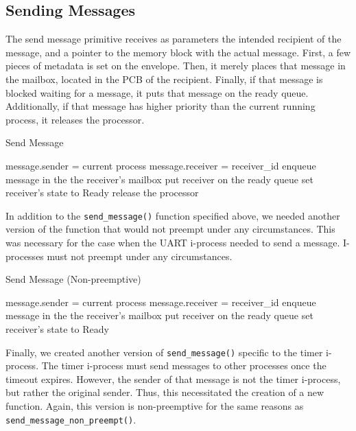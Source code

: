 \documentclass[12pt]{report}
\begin{document}
\subsection{Sending Messages}

The send message primitive receives as parameters the intended recipient of the message, and a pointer to the memory block with the actual message. First, a few pieces of metadata is set on the envelope. Then, it merely places that message in the mailbox, located in the PCB of the recipient. Finally, if that message is blocked waiting for a message, it puts that message on the ready queue. Additionally, if that message has higher priority than the current running process, it releases the processor.

\begin{algorithm}[H]
	\caption{Send Message}
	\begin{algorithmic}[1]
			\State message.sender = current process
			\State message.receiver = receiver_id
			\State enqueue message in the the receiver's mailbox
				\State put receiver on the ready queue
				\State set receiver's state to Ready
					\State release the processor
				\EndIf
			\EndIf
		\EndFunction
	\end{algorithmic}
\end{algorithm}

In addition to the \texttt{send_message()} function specified above, we needed another version of the function that would not preempt under any circumstances. This was necessary for the case when the UART i-process needed to send a message. I-processes must not preempt under any circumstances.

\begin{algorithm}[H]
	\caption{Send Message (Non-preemptive)}
	\begin{algorithmic}[1]
			\State message.sender = current process
			\State message.receiver = receiver_id
			\State enqueue message in the the receiver's mailbox
				\State put receiver on the ready queue
				\State set receiver's state to Ready
			\EndIf
		\EndFunction
	\end{algorithmic}
\end{algorithm}


Finally, we created another version of \texttt{send_message()} specific to the timer i-process. The timer i-process must send messages to other processes once the timeout expires. However, the sender of that message is not the timer i-process, but rather the original sender. Thus, this necessitated the creation of a new function. Again, this version is non-preemptive for the same reasons as \texttt{send_message_non_preempt()}.
\end{document}

